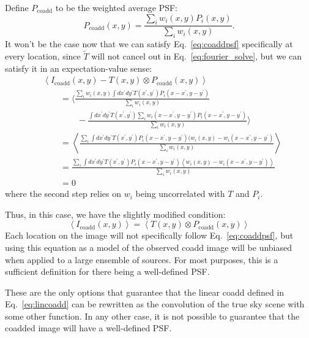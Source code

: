 \documentclass[modern]{style_and_logos/lsstdescnote}
\newcommand{\rachel}[1]{{\color{magenta}RM: #1}}
\newcommand{\mike}[1]{{\color{cyan}MJ: #1}}
\begin{document}
\begin{itemize}
    Define $P_\text{coadd}$ to be the weighted average PSF:
    \begin{equation}\label{eq:varweightpsf}
        P_\text{coadd}(x,y) = \frac{\sum_i w_i(x,y) P_i(x,y)}{\sum_i w_i(x,y)}.
    \end{equation}
    It won't be the case now that we can satisfy Eq.~\eqref{eq:coaddpsf} specifically at every location, since $\widetilde{T}$ will not cancel out in Eq.~\eqref{eq:fourier_solve}, but we can satisfy it in an expectation-value sense:
    \begin{align*}
      &\left\langle I_\text{coadd}(x,y) - T(x,y) \otimes P_\text{coadd}(x,y) \right\rangle \\
      &\qquad= \Bigg\langle \frac{
                  \sum_i w_i(x,y) \int dx^\prime dy^\prime T(x^\prime,y^\prime) P_i(x-x^\prime,y-y^\prime)  }{\sum_i w_i(x,y)} \qquad \\
      &\qquad \qquad - \frac{\int dx^\prime dy^\prime T(x^\prime,y^\prime) \sum_i w_i(x-x^\prime,y-y^\prime) P_i(x-x^\prime,y-y^\prime)}{\sum_i w_i(x,y)} \Bigg\rangle \\
      &\qquad= \left\langle\frac{
                  \sum_i \int dx^\prime dy^\prime T(x^\prime,y^\prime) P_i(x-x^\prime,y-y^\prime) (w_i(x,y) - w_i(x-x^\prime,y-y^\prime)}{\sum_i w_i(x,y)} \right\rangle \\
      &\qquad= \frac{
                  \sum_i \int dx^\prime dy^\prime T(x^\prime,y^\prime) P_i(x-x^\prime,y-y^\prime) \left\langle w_i(x,y) - w_i(x-x^\prime,y-y^\prime)\right\rangle}{\sum_i w_i(x,y)} \\
      &\qquad= 0
    \end{align*}
    where the second step relies on $w_i$ being uncorrelated with $T$ and $P_i$.
    
    Thus, in this case, we have the slightly modified condition:
    \begin{equation}\label{eq:expcoaddpsf}
        \left\langle I_\text{coadd}(x,y) \right\rangle = \left\langle T(x,y) \otimes P_\text{coadd}(x,y) \right\rangle
    \end{equation}
    Each location on the image will not specifically follow Eq.~\eqref{eq:coaddpsf}, but using this equation as a model of the observed coadd image will be unbiased when applied to a large ensemble of sources.  For most purposes, this is a sufficient definition for there being a well-defined PSF.

\end{itemize}
These are the only options that guarantee that the linear coadd defined in Eq.~\eqref{eq:lincoadd} can be rewritten as the convolution of the true sky scene with some other function. In any other case, it is not possible to guarantee that the coadded image will have a well-defined PSF.
\end{document}
